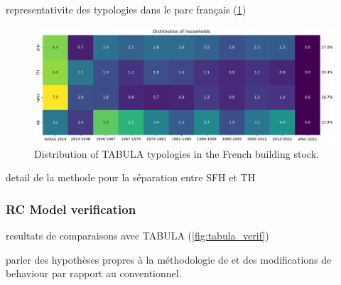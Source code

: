 \documentclass[11pt]{article}
\begin{document}
        representativite des typologies dans le parc français (\ref{fig:tab_stock})

        \begin{figure}[ht]
            \centering
            \includegraphics[width=0.99\columnwidth]{figures/bgc_distribution_tabula_households_ponderated.png}
            \caption{\label{fig:tab_stock} Distribution of TABULA typologies in the French building stock.}
        \end{figure}

        detail de la methode pour la séparation entre SFH et TH

        





        \subsubsection{RC Model verification} %
        \label{ssub:model_verification}
        
        resultats de comparaisons avec TABULA (\ref{fig:tabula_verif})

        parler des hypothèses propres à la méthodologie de \textcite{pouget_consultants_batiments_2015} et des modifications de behaviour par rapport au conventionnel. 
\end{document}

